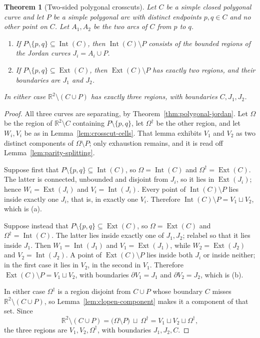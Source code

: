\documentclass[11pt]{article}
\theoremstyle{mainplain}
\theoremstyle{mainroman}
\newtheorem{longtheorem}[theorem]{Theorem}
\theoremstyle{definition}
\newcommand{\alphlabels}{\renewcommand{\labelenumi}{\textup{(\alph{enumi})}}%
  \renewcommand{\theenumi}{\alph{enumi}}}
\numberwithin{equation}{section}
\begin{document}
\begin{longtheorem}[Two-sided polygonal crosscuts]\label{thm:polygonal-crosscut}
Let $C$ be a simple closed polygonal curve and let $P$ be a simple
polygonal arc with distinct endpoints $p,q\in C$ and no other point on
$C$. Let $A_1,A_2$ be the two arcs of $C$ from $p$ to $q$.

\begin{enumerate}\alphlabels
\item If $P\setminus\{p,q\}\subseteq\operatorname{Int}(C)$, then
      $\operatorname{Int}(C)\setminus P$ consists of the bounded
      regions of the Jordan curves $J_i=A_i\cup P$.
\item If $P\setminus\{p,q\}\subseteq\operatorname{Ext}(C)$, then
      $\operatorname{Ext}(C)\setminus P$ has exactly two regions, and
      their boundaries are $J_1$ and $J_2$.
\end{enumerate}
In either case $\mathbb R^2\setminus(C\cup P)$ has exactly three
regions, with boundaries $C,J_1,J_2$.
\end{longtheorem}
\begin{proof}
All three curves are separating, by
Theorem~\ref{thm:polygonal-jordan}. Let $\Omega$ be the region of
$\mathbb R^2\setminus C$ containing $P\setminus\{p,q\}$, let
$\Omega^\dagger$ be the other region, and let $W_i,V_i$ be as in
Lemma~\ref{lem:crosscut-cells}. That lemma exhibits $V_1$ and $V_2$ as
two distinct components of $\Omega\setminus P$; only exhaustion
remains, and it is read off Lemma~\ref{lem:parity-splitting}.

Suppose first that $P\setminus\{p,q\}\subseteq\operatorname{Int}(C)$,
so $\Omega=\operatorname{Int}(C)$ and
$\Omega^\dagger=\operatorname{Ext}(C)$. The latter is connected,
unbounded and disjoint from $J_i$, so it lies in
$\operatorname{Ext}(J_i)$; hence $W_i=\operatorname{Ext}(J_i)$ and
$V_i=\operatorname{Int}(J_i)$. Every point of
$\operatorname{Int}(C)\setminus P$ lies inside exactly one $J_i$, that
is, in exactly one $V_i$. Therefore
$\operatorname{Int}(C)\setminus P=V_1\sqcup V_2$, which is (a).

Suppose instead that $P\setminus\{p,q\}\subseteq\operatorname{Ext}(C)$,
so $\Omega=\operatorname{Ext}(C)$ and
$\Omega^\dagger=\operatorname{Int}(C)$. The latter lies inside exactly
one of $J_1,J_2$; relabel so that it lies inside $J_1$. Then
$W_1=\operatorname{Int}(J_1)$ and $V_1=\operatorname{Ext}(J_1)$, while
$W_2=\operatorname{Ext}(J_2)$ and $V_2=\operatorname{Int}(J_2)$. A point
of $\operatorname{Ext}(C)\setminus P$ lies inside both $J_i$ or inside
neither; in the first case it lies in $V_2$, in the second in $V_1$.
Therefore $\operatorname{Ext}(C)\setminus P=V_1\sqcup V_2$, with
boundaries $\partial V_1=J_1$ and $\partial V_2=J_2$, which is (b).

In either case $\Omega^\dagger$ is a region disjoint from $C\cup P$
whose boundary $C$ misses $\mathbb R^2\setminus(C\cup P)$, so
Lemma~\ref{lem:clopen-component} makes it a component of that set.
Since
\[
 \mathbb R^2\setminus(C\cup P)
 =\bigl(\Omega\setminus P\bigr)\ \sqcup\ \Omega^\dagger
 =V_1\sqcup V_2\sqcup\Omega^\dagger,
\]
the three regions are $V_1,V_2,\Omega^\dagger$, with boundaries
$J_1,J_2,C$.
\end{proof}
\end{document}
